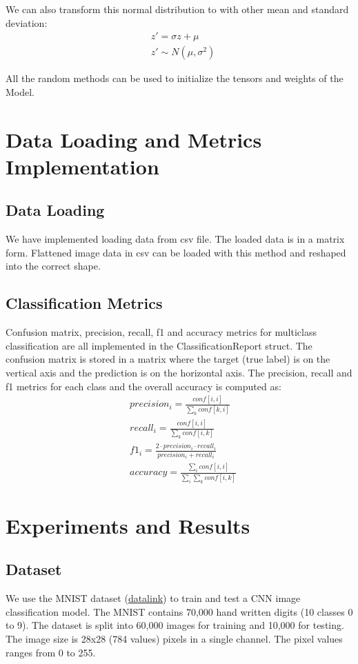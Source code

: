 \documentclass[conference]{IEEEtran}
\begin{document}
We can also transform this normal distribution to with other mean and standard deviation:
\begin{equation}
\begin{split}
&z' = \sigma z  + \mu \\
&z' \sim N(\mu,\sigma^2)
\end{split}
\end{equation}

All the random methods can be used to initialize the tensors and weights of the Model.

\section{Data Loading and Metrics Implementation}
\subsection{Data Loading}
We have implemented loading data from csv file. The loaded data is in a matrix form. Flattened image data in csv can be loaded with this method and reshaped into the correct shape.
\subsection{Classification Metrics}
Confusion matrix, precision, recall, f1 and accuracy metrics for multiclass classification are all implemented in the ClassificationReport struct. The confusion matrix is stored in a matrix where the target (true label) is on the vertical axis and the prediction is on the horizontal axis. The precision, recall and f1 metrics for each class and the overall accuracy is computed as:
\begin{equation}
\begin{split}
&precision_i =\frac{conf[i,i]}{\sum_k conf[k, i]} \\
&recall_i = \frac{conf[i,i]}{\sum_k conf[i, k]} \\
&f1_i = \frac{2\cdot precision_i \cdot recall_i}{precision_i + recall_i} \\
&accuracy = \frac{\sum_iconf[i,i]}{\sum_i\sum_k conf[i,k]}
\end{split}
\end{equation}


\section{Experiments and Results}
\subsection{Dataset}
We use the MNIST \cite{mnist} dataset (\href{https://www.kaggle.com/datasets/oddrationale/mnist-in-csv}{datalink}) to train and test a CNN image classification model. The MNIST contains 70,000 hand written digits (10 classes 0 to 9). The dataset is split into 60,000 images for training and 10,000 for testing. The image size is 28x28 (784 values) pixels in a single channel. The pixel values ranges from 0 to 255.
\end{document}
